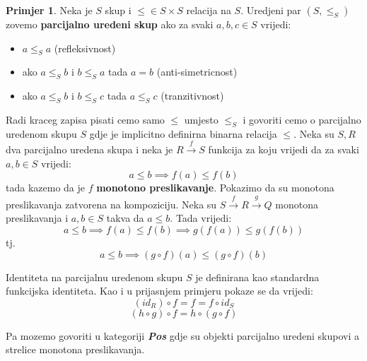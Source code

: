 \documentclass[11pt]{article}
\newcommand{\bold}[1]{\textbf{#1}}
\newcommand{\category}[1]{\bold{\emph{#1}}}
\theoremstyle{definition}
\newtheorem{primjer}{Primjer}
\begin{document}
  \begin{primjer}
    Neka je $S$ skup i $\leq \in S \times S$ relacija na $S$. Uredjeni par $(S,
    \leq_S)$ zovemo \bold{parcijalno uredeni skup} ako za svaki $a, b, c \in S$
    vrijedi:
    \begin{itemize}
      \item $a \leq_S a$ (refleksivnost)
      \item ako $a \leq_S b$ i $b \leq_S a$ tada $a = b$ (anti-simetricnost)
      \item ako $a \leq_S b$ i $b \leq_S c$ tada $a \leq_S c$ (tranzitivnost)
    \end{itemize}
  Radi kraceg zapisa pisati cemo samo $\leq$ umjesto $\leq_S$ i
  govoriti cemo o parcijalno uredenom skupu $S$ gdje je implicitno definirna
  binarna relacija $\leq$.
  Neka su $S, R$ dva parcijalno uredena skupa i neka je $R \xrightarrow{f} S$
  funkcija za koju vrijedi da za svaki $a, b \in S$ vrijedi:
  \begin{equation*}
    a \leq b \implies f(a) \leq f(b)
  \end{equation*}
  tada kazemo da je $f$ \bold{monotono preslikavanje}.
  Pokazimo da su monotona preslikavanja zatvorena na kompoziciju.
  Neka su $S \xrightarrow{f} R \xrightarrow{g} Q$ monotona preslikavanja i $a,
  b \in S$ takva da $a \leq b$. Tada vrijedi:
  \begin{equation*}
    a \leq b \implies f(a) \leq f(b) \implies g(f(a)) \leq g(f(b))
  \end{equation*}
  tj.
  \begin{equation*}
    a \leq b \implies (g \circ f)(a) \leq (g \circ f)(b)
  \end{equation*}

  Identiteta na parcijalnu uredenom skupu $S$ je definirana kao standardna
  funkcijska identiteta. Kao i u prijasnjem primjeru pokaze se da vrijedi:
  \begin{equation*}
    (id_R) \circ f = f = f \circ id_S
  \end{equation*}
  \begin{equation*}
    (h \circ g) \circ f = h \circ (g \circ f)
  \end{equation*}
  \end{primjer}
  Pa mozemo govoriti u kategoriji \category{Pos} gdje su objekti parcijalno
  uredeni skupovi a strelice monotona preslikavanja.
\end{document}
